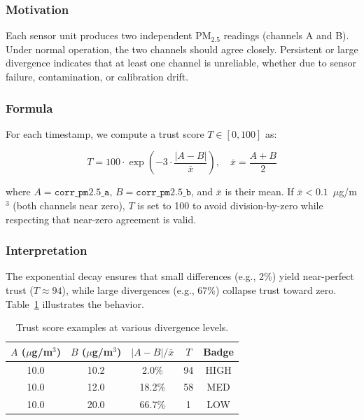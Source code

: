 \documentclass[11pt, letterpaper]{article}
\begin{document}
\subsubsection{Motivation}

Each sensor unit produces two independent PM$_{2.5}$ readings (channels A and B).
Under normal operation, the two channels should agree closely.
Persistent or large divergence indicates that at least one channel is unreliable,
whether due to sensor failure, contamination, or calibration drift.

\subsubsection{Formula}

For each timestamp, we compute a trust score $T \in [0, 100]$ as:

\begin{equation}
  T = 100 \cdot \exp\!\left(-3 \cdot \frac{|A - B|}{\bar{x}}\right),
  \quad \bar{x} = \frac{A + B}{2}
  \label{eq:trust}
\end{equation}

where $A = \mathtt{corr\_pm2.5\_a}$, $B = \mathtt{corr\_pm2.5\_b}$, and
$\bar{x}$ is their mean.
If $\bar{x} < 0.1$~$\mu$g/m$^3$ (both channels near zero), $T$ is set to 100
to avoid division-by-zero while respecting that near-zero agreement is valid.

\subsubsection{Interpretation}

The exponential decay ensures that small differences (e.g., 2\%) yield
near-perfect trust ($T \approx 94$), while large divergences (e.g., 67\%) collapse
trust toward zero.
Table~\ref{tab:trust_examples} illustrates the behavior.

\begin{table}[h!]
\centering
\caption{Trust score examples at various divergence levels.}
\label{tab:trust_examples}
\begin{tabular}{ccccc}
\toprule
$A$ ($\mu$g/m$^3$) & $B$ ($\mu$g/m$^3$) & $|A-B|/\bar{x}$ & $T$ & Badge \\
\midrule
10.0 & 10.2 & 2.0\%  & 94 & HIGH \\
10.0 & 12.0 & 18.2\% & 58 & MED  \\
10.0 & 20.0 & 66.7\% & 1  & LOW  \\
\bottomrule
\end{tabular}
\end{table}
\end{document}
